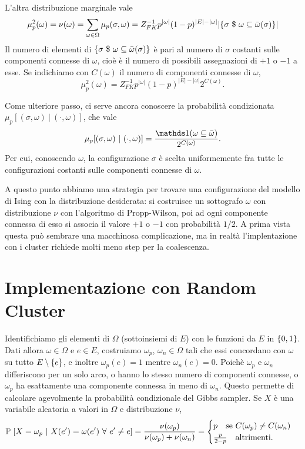 \documentclass[]{marticle}
\begin{document}
L'altra distribuzione marginale vale
\[
    \mu^2_p(\omega) = \nu(\omega) = \sum_{\omega\in\Omega} \mu_p(\sigma,\omega)
    = Z_{FK}^{-1} p^{|\omega|} (1-p)^{|E| - |\omega|} |\{\sigma \ \$\ 
    \omega\subseteq\bar{\omega}(\sigma)\}|
\]
Il numero di elementi di $\{\sigma \ \$\ 
\omega\subseteq\bar{\omega}(\sigma)\}$ \`e pari al numero di $\sigma$ costanti
sulle componenti connesse di $\omega$, cio\`e \`e il numero di possibili
assegnazioni di $+1$ o $-1$ a esse. Se indichiamo con $C(\omega)$ il numero di
componenti connesse di $\omega$,
\[
    \mu^2_p(\omega) = 
    Z_{FK}^{-1} p^{|\omega|} (1-p)^{|E| - |\omega|} 2^{C(\omega)}.
\]

Come ulteriore passo, ci serve ancora conoscere la probabilit\`a condizionata
$\mu_p[(\sigma,\omega)\ |\ (\cdot,\omega)]$, che vale 
\[
    \mu_p[(\sigma,\omega)\ |\ (\cdot,\omega)]
    = \frac{\ind(\omega \subseteq \bar{\omega})} {2^{C(\omega)}}.
\]
Per cui, conoscendo $\omega$, la configurazione $\sigma$ \`e scelta
uniformemente fra tutte le configurazioni costanti sulle componenti connesse di
$\omega$.

A questo punto abbiamo una strategia per trovare una configurazione del modello
di Ising con la distribuzione desiderata: si costruisce un sottografo $\omega$
con distribuzione $\nu$ con l'algoritmo di Propp-Wilson, poi ad ogni componente
connessa di esso si associa il valore $+1$ o $-1$ con probabilit\`a $1/2$. A
prima vista questa pu\`o sembrare una macchinosa complicazione, ma in realt\`a
l'implentazione con i cluster richiede molti meno step per la coalescenza.

\section{Implementazione con Random Cluster}

Identifichiamo gli elementi di $\Omega$ (sottoinsiemi di $E$) con le funzioni da
$E$ in  $\{0,1\}$. Dati allora $\omega\in\Omega$ e $e\in E$, costruiamo
$\omega_p$, $\omega_n\in\Omega$ tali che essi concordano con $\omega$ su tutto
$E \setminus \{e\}$, e inoltre $\omega_p(e) = 1$ mentre $\omega_n(e)=0$. 
Poich\`e $\omega_p$ e $\omega_n$ differiscono per un solo arco, o hanno lo
stesso numero di componenti connesse, o $\omega_p$ ha esattamente una componente
connessa in meno di $\omega_n$. Questo permette di calcolare agevolmente la
probabilit\`a condizionale del Gibbs sampler. Se $X$ \`e una variabile aleatoria
a valori in $\Omega$ e distribuzione $\nu$,
\[
    \prob{X=\omega_p \ |\ X(e')=\omega(e') \ \forall e' \neq e} = 
    \frac{\nu(\omega_p)}{\nu(\omega_p)+\nu(\omega_n)} = 
    \begin{cases}
        p \text{\quad se $C(\omega_p) \neq C(\omega_n)$}\\
        \frac{p}{2-p} \text{\quad altrimenti}.
    \end{cases}
\]
\end{document}

